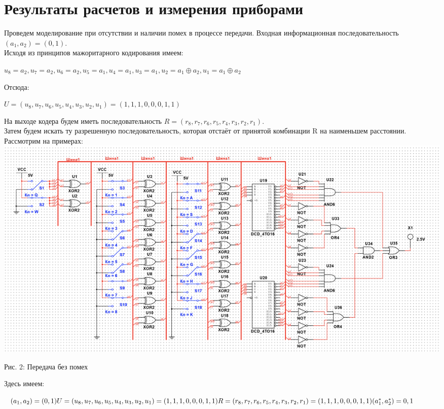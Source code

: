 \documentclass[14pt]{article}
\begin{document}
\section{Результаты расчетов и измерения приборами}
Проведем моделирование при отсутствии и наличии помех в процессе передачи. Входная информационная последовательность $(a_{1}, a_{2}) = (0, 1)$.\\
Исходя из принципов мажоритарного кодирования имеем:\\
\begin{center}
    $u_{8} = a_{2}, u_{7} = a_{2}, u_{6} = a_{2}, u_{5} = a_{1}, u_{4} = a_{1}, u_{3} = a_{1}, u_{2} = a_{1} \oplus a_{2}, u_{1} =a_{1} \oplus a_{2}$\\
\end{center}
Отсюда:\\
\begin{center}
    $U = (u_{8}, u_{7}, u_{6}, u_{5}, u_{4}, u_{3}, u_{2}, u_{1}) = (1, 1, 1, 0, 0, 0, 1, 1)$\\
\end{center}
На выходе кодера будем иметь последовательность $R = (r_{8}, r_{7}, r_{6}, r_{5}, r_{4}, r_{3}, r_{2}, r_{1})$.\\
Затем будем искать ту разрешенную последовательность, которая отстаёт от принятой комбинации R на наименьшем расстоянии.\\
\newpage
Рассмотрим на примерах:\\
\includegraphics[width=1\linewidth]{bezpomeh.png}
\begin{center}
Рис. 2: Передача без помех
\end{center}
Здесь имеем:
\begin{center}
    $(a_{1}, a_{2}) = (0, 1)\\

    U = (u_{8}, u_{7}, u_{6}, u_{5}, u_{4}, u_{3}, u_{2}, u_{1}) = (1, 1, 1, 0, 0, 0, 1, 1)\\
    R = (r_{8}, r_{7}, r_{6}, r_{5}, r_{4}, r_{3}, r_{2}, r_{1}) = (1, 1, 1, 0, 0, 0, 1, 1)\\
    (a_{1}^{*}, a_{2}^{*}) = {0, 1} 
    $
\end{center}
\end{document}
